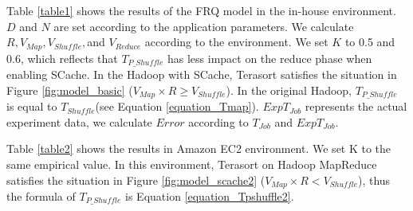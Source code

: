 {Table \ref{table1} shows the results of the FRQ model in the in-house environment.
\(D\) and \(N\) are set according to the application parameters. We calculate \(R, V_{Map}, V_{Shuffle},\)and \(V_{Reduce}\) according to the environment. We set \(K\) to 0.5 and 0.6, which reflects that \(T_{P\_Shuffle}\) has less impact on the reduce phase when enabling SCache. 
In the Hadoop with SCache, Terasort satisfies the situation in Figure \ref{fig:model_basic} (\(V_{Map} \times R \ge V_{Shuffle}\)). 
In the original Hadoop, \(T_{P\_Shuffle}\) is equal to \(T_{Shuffle}\)(see Equation \ref{equation_Tmap}). \(ExpT_{Job}\) represents the actual experiment data, we calculate \(Error\) according to \(T_{Job}\) and \(ExpT_{Job}\). 

Table \ref{table2} shows the results in Amazon EC2 environment.
We set K to the same empirical value.
In this environment, Terasort on Hadoop MapReduce satisfies the situation in Figure \ref{fig:model_scache2} (\(V_{Map} \times R < V_{Shuffle}\)), thus the formula of \(T_{P\_Shuffle}\) is Equation \ref{equation_Tpshuffle2}. 


}
